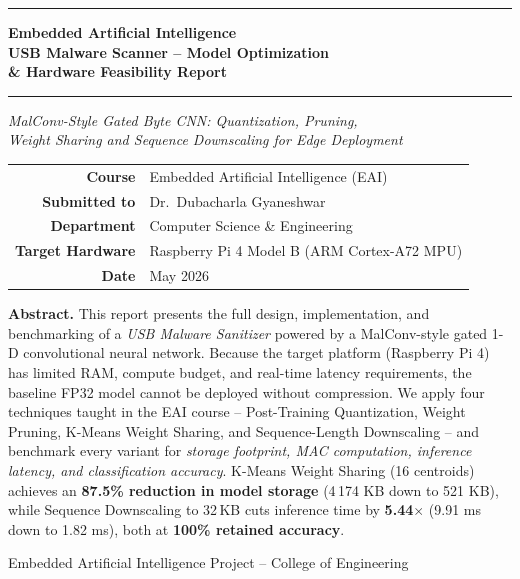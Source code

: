 \documentclass[12pt,a4paper]{article}
\begin{document}
\begin{titlepage}
\centering
\vspace*{1.5cm}

{\color{NavyBlue}\rule{\linewidth}{2pt}}
\vspace{0.4cm}

{\fontsize{22}{28}\selectfont\bfseries\color{NavyBlue}
Embedded Artificial Intelligence\\[6pt]
\large USB Malware Scanner -- Model Optimization\\
\& Hardware Feasibility Report}

\vspace{0.3cm}
{\color{NavyBlue}\rule{\linewidth}{2pt}}
\vspace{1.5cm}

{\large\itshape MalConv-Style Gated Byte CNN: Quantization, Pruning,\\
Weight Sharing and Sequence Downscaling for Edge Deployment}

\vspace{2.5cm}

\begin{tabular}{rl}
  \textbf{Course}          & Embedded Artificial Intelligence (EAI)\\[4pt]
  \textbf{Submitted to}    & Dr.\ Dubacharla Gyaneshwar\\[4pt]
  \textbf{Department}      & Computer Science \& Engineering\\[4pt]
  \textbf{Target Hardware} & Raspberry Pi 4 Model B (ARM Cortex-A72 MPU)\\[4pt]
  \textbf{Date}            & May 2026
\end{tabular}

\vspace{2.5cm}

\begin{tcolorbox}[warnbox, title={}]
\textbf{Abstract.}\quad
This report presents the full design, implementation, and benchmarking of a
\textit{USB Malware Sanitizer} powered by a MalConv-style gated 1-D convolutional
neural network.  Because the target platform (Raspberry Pi 4) has limited RAM,
compute budget, and real-time latency requirements, the baseline FP32 model
cannot be deployed without compression.  We apply four techniques taught in the
EAI course -- Post-Training Quantization, Weight Pruning, K-Means Weight
Sharing, and Sequence-Length Downscaling -- and benchmark every variant for
\textit{storage footprint, MAC computation, inference latency, and classification
accuracy}.  K-Means Weight Sharing (16 centroids) achieves an \textbf{87.5\%
reduction in model storage} (4\,174 KB down to 521 KB), while Sequence
Downscaling to 32\,KB cuts inference time by \textbf{5.44$\times$} (9.91 ms
down to 1.82 ms), both at \textbf{100\% retained accuracy}.
\end{tcolorbox}

\vfill
{\small\color{MidGray}Embedded Artificial Intelligence Project -- College of Engineering}
\end{titlepage}
\end{document}
